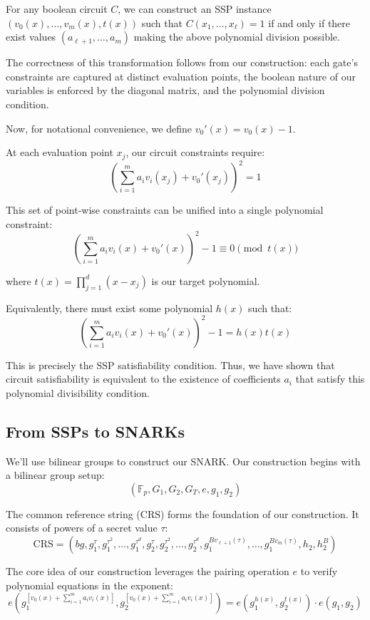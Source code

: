 \documentclass[12pt]{tufte-book}
\begin{document}
For any boolean circuit $C$, we can construct an SSP instance $(v_0(x),\ldots,v_m(x),t(x))$ such that $C(x_1,\ldots,x_\ell) = 1$ if and only if there exist values $(a_{\ell+1},\ldots,a_m)$ making the above polynomial division possible.

The correctness of this transformation follows from our construction: each gate's constraints are captured at distinct evaluation points, the boolean nature of our variables is enforced by the diagonal matrix, and the polynomial division condition.




Now, for notational convenience, we define $v_0'(x) = v_0(x) - 1$. 

At each evaluation point $x_j$, our circuit constraints require:
\[ \left(\sum_{i=1}^m a_i v_i(x_j) + v_0'(x_j)\right)^2 = 1 \]

This set of point-wise constraints can be unified into a single polynomial constraint:
\[ \left(\sum_{i=1}^m a_i v_i(x) + v_0'(x)\right)^2 - 1 \equiv 0 \pmod{t(x)} \]

where $t(x) = \prod_{j=1}^d (x - x_j)$ is our target polynomial.

Equivalently, there must exist some polynomial $h(x)$ such that:
\[ \left(\sum_{i=1}^m a_i v_i(x) + v_0'(x)\right)^2 - 1 = h(x)t(x) \]

This is precisely the SSP satisfiability condition. Thus, we have shown that circuit satisfiability is equivalent to the existence of coefficients $a_i$ that satisfy this polynomial divisibility condition.

\subsection{From SSPs to SNARKs}

We'll use bilinear groups to construct our SNARK. Our construction begins with a bilinear group setup:
\[ (\mathbb{F}_p, G_1, G_2, G_T, e, g_1, g_2) \]

The common reference string (CRS) forms the foundation of our construction. It consists of powers of a secret value $\tau$:
\[ \text{CRS} = (bg, g_1^\tau, g_1^{\tau^2}, \dots, g_1^{\tau^d}, g_2^\tau, g_2^{\tau^2}, \dots, g_2^{\tau^d}, g_1^{B v_{\ell + 1}(\tau)}, \dots, g_1^{B v_m(\tau)}, h_2, h_2^B) \]

The core idea of our construction leverages the pairing operation $e$ to verify polynomial equations in the exponent:
\[ e(g_1^{[v_0(x) + \sum_{i=1}^m a_i v_i(x)]}, g_2^{[v_0(x) + \sum_{i=1}^m a_i v_i(x)]}) = e(g_1^{h(x)}, g_2^{t(x)}) \cdot e(g_1, g_2) \]
\end{document}
